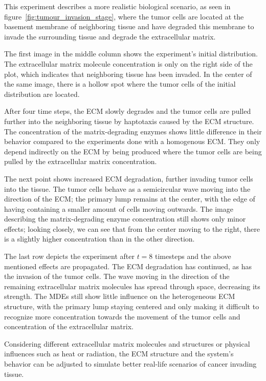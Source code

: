 This experiment describes a more realistic biological scenario, as seen in figure~\ref{fig:tumour_invasion_stage}, where the tumor cells are located at the basement membrane of neighboring tissue and have degraded this membrane to invade the surrounding tissue and degrade the extracellular matrix.

The first image in the middle column shows the experiment's initial distribution. The extracellular matrix molecule concentration is only on the right side of the plot, which indicates that neighboring tissue has been invaded. In the center of the same image, there is a hollow spot where the tumor cells of the initial distribution are located. 

After four time steps, the ECM slowly degrades and the tumor cells are pulled further into the neighboring tissue by haptotaxis caused by the ECM structure. The concentration of the matrix-degrading enzymes shows little difference in their behavior compared to the experiments done with a homogenous ECM. They only depend indirectly on the ECM by being produced where the tumor cells are being pulled by the extracellular matrix concentration. 

The next point shows increased ECM degradation, further invading tumor cells into the tissue. The tumor cells behave as a semicircular wave moving into the direction of the ECM; the primary lump remains at the center, with the edge of having containing a smaller amount of cells moving outwards. The image describing the matrix-degrading enzyme concentration still shows only minor effects; looking closely, we can see that from the center moving to the right, there is a slightly higher concentration than in the other direction.

The last row depicts the experiment after $t=8$ timesteps and the above mentioned effects are propagated. The ECM degradation has continued, as has the invasion of the tumor cells. The wave moving in the direction of the remaining extracellular matrix molecules has spread through space, decreasing its strength. The MDEs still show little influence on the heterogeneous ECM structure, with the primary lump staying centered and only making it difficult to recognize more concentration towards the movement of the tumor cells and concentration of the extracellular matrix.
 
Considering different extracellular matrix molecules and structures or physical influences such as heat or radiation, the ECM structure and the system's behavior can be adjusted to simulate better real-life scenarios of cancer invading tissue.
